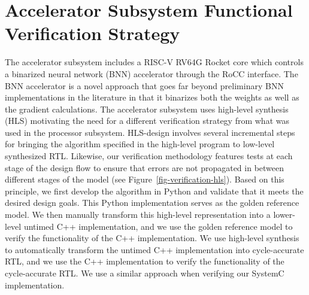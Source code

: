 
\section{Accelerator Subsystem Functional Verification Strategy}



The accelerator subsystem includes a RISC-V RV64G Rocket core which
controls a binarized neural network (BNN) accelerator through the RoCC
interface. The BNN accelerator is a novel approach that goes far beyond
preliminary BNN implementations in the literature in that it binarizes
both the weights as well as the gradient calculations. The accelerator
subsystem uses high-level synthesis (HLS) motivating the need for a
different verification strategy from what was used in the processor
subsystem. HLS-design involves several incremental steps for bringing the
algorithm specified in the high-level program to low-level synthesized
RTL. Likewise, our verification methodology features tests at each stage
of the design flow to ensure that errors are not propagated in between
different stages of the model (see Figure~\ref{fig-verification-hls}).
Based on this principle, we first develop the algorithm in Python and
validate that it meets the desired design goals. This Python
implementation serves as the golden reference model. We then manually
transform this high-level representation into a lower-level untimed C++
implementation, and we use the golden reference model to verify the
functionality of the C++ implementation. We use high-level synthesis to
automatically transform the untimed C++ implementation into
cycle-accurate RTL, and we use the C++ implementation to verify the
functionality of the cycle-accurate RTL. We use a similar approach when
verifying our SystemC implementation.


